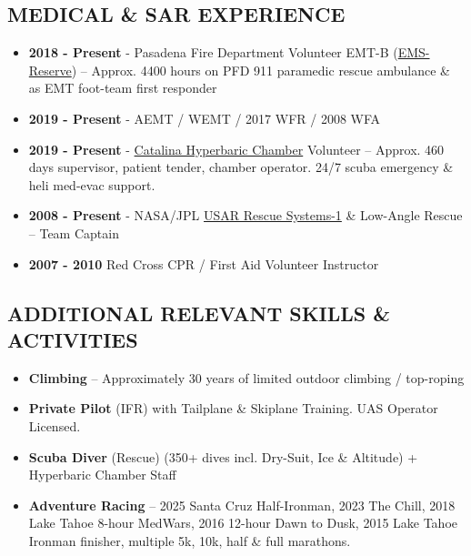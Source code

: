 \documentclass[11pt,letterpaper]{article}
\begin{document}
\subsection*{MEDICAL \& SAR EXPERIENCE}
\begin{itemize}
\item \textbf{2018 - Present} - Pasadena Fire Department Volunteer EMT-B (\href{https://pasadenanow.com/main/pasadena-fire-department-emergency-reserve-answers-the-call-of-duty}{EMS-Reserve}) – Approx. 4400 hours on PFD 911 paramedic rescue ambulance \& as EMT foot-team first responder
\item \textbf{2019 - Present} - AEMT / WEMT / 2017 WFR / 2008 WFA
\item \textbf{2019 - Present} - \href{https://dornsife.usc.edu/hyperbaric/}{Catalina Hyperbaric Chamber} Volunteer – Approx. 460 days supervisor, patient tender, chamber operator. 24/7 scuba emergency \& heli med-evac support.
\item \textbf{2008 - Present} - NASA/JPL \href{https://www.catf-4.org/wp-content/uploads/2019/02/RS1.StManual.pdf}{USAR Rescue Systems-1} \& Low-Angle Rescue – Team Captain
\item \textbf{2007 - 2010} Red Cross CPR / First Aid Volunteer Instructor
\end{itemize}

\subsection*{ADDITIONAL RELEVANT SKILLS \& ACTIVITIES}
\begin{itemize}
\item \textbf{Climbing} – Approximately 30 years of limited outdoor climbing / top-roping
\item \textbf{Private Pilot} (IFR) with Tailplane \& Skiplane Training. UAS Operator Licensed.
\item \textbf{Scuba Diver} (Rescue) (350+ dives incl. Dry-Suit, Ice \& Altitude) + Hyperbaric Chamber Staff
\item \textbf{Adventure Racing} – 2025 Santa Cruz Half-Ironman, 2023 The Chill, 2018 Lake Tahoe 8-hour MedWars, 2016 12-hour Dawn to Dusk, 2015 Lake Tahoe Ironman finisher, multiple 5k, 10k, half \& full marathons.
\end{itemize}
\end{document}
